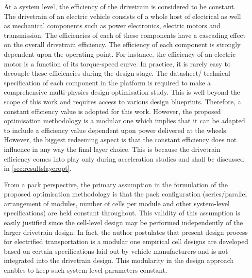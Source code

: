 At  a  system level,  the  efficiency  of the  drivetrain  is  considered to  be
constant. The  drivetrain of  an electric  vehicle consists of  a whole  host of
electrical as well as mechanical  components such as power electronics, electric
motors and  transmission. The efficiencies  of each  of these components  have a
cascading effect  on the overall  drivetrain efficiency. The efficiency  of each
component  is strongly  dependent upon  the operating  point. For  instance, the
efficiency of  an electric  motor is  a function of  its torque-speed  curve. In
practice, it  is rarely easy  to decouple  these efficiencies during  the design
stage. The datasheet/ technical specification  of each component in the platform
is required  to make  a comprehensive  multi-physics design  optimisation study.
This is well beyond the scope of this work and requires access to various design
blueprints. Therefore,  a constant  efficiency value is  adopted for  this work.
However, the  proposed optimisation methodology  is a modular one  which implies
that it can be adapted \eg{} to  include a efficiency value dependent upon power
delivered  at the  wheels. However,  the biggest  redeeming aspect  is that  the
constant efficiency does  not influence in any way the  final layer choice. This
is because  the drivetrain efficiency  comes into play only  during acceleration
studies and shall be discussed in \cref{sec:resultslayeropt}.

From  a  pack  perspective,  the   primary  assumption  in  the  formulation  of
the   proposed  optimisation   methodology  is   that  the   pack  configuration
(series/parallel arrangement  of modules, number  of cells per module  and other
system-level specifications) are held constant throughout. This validity of this
assumption  is easily  justified since  the cell-level  design may  be performed
independently of  the larger drivetrain  design. In fact, the  author postulates
that  present design  process for  electrified transportation  is a  modular one
\ie{} empirical cell designs are  developed based on certain specifications laid
out by vehicle  manufacturers and is not integrated into  the drivetrain design.
This  modularity  in the  design  approach  enables  to keep  such  system-level
parameters constant.

